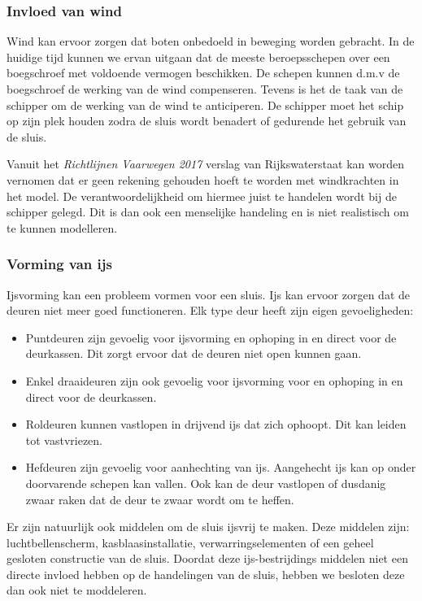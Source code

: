 \documentclass{article}
\begin{document}

\subsubsection{Invloed van wind} %
Wind kan ervoor zorgen dat boten onbedoeld in beweging worden gebracht. In de huidige tijd kunnen we ervan uitgaan dat de meeste beroepsschepen over een boegschroef  met voldoende vermogen beschikken. De schepen kunnen d.m.v de boegschroef de werking van de wind compenseren. Tevens is het de taak van de schipper om de werking van de wind te anticiperen. De schipper moet het schip op zijn plek houden zodra de sluis wordt benadert of gedurende het gebruik van de sluis.

Vanuit het \textit{Richtlijnen Vaarwegen 2017} verslag van Rijkswaterstaat \cite{rijkswaterstaat2017} kan worden vernomen dat er geen rekening gehouden hoeft te worden met windkrachten in het model. De verantwoordelijkheid om hiermee juist te handelen wordt bij de schipper gelegd. Dit is dan ook een menselijke handeling en is niet realistisch om te kunnen modelleren.

\vskip0.5cm

\subsubsection{Vorming van ijs}
Ijsvorming kan een probleem vormen voor een sluis. Ijs kan ervoor zorgen dat de deuren niet meer goed functioneren. Elk type deur heeft zijn eigen gevoeligheden:
\begin{itemize}
\item Puntdeuren zijn gevoelig voor ijsvorming en ophoping in en direct voor de deurkassen. Dit zorgt ervoor dat de deuren niet open kunnen gaan.
\item Enkel draaideuren zijn ook gevoelig voor ijsvorming voor en ophoping in en direct voor de deurkassen.
\item Roldeuren kunnen vastlopen in drijvend ijs dat zich ophoopt. Dit kan leiden tot vastvriezen.
\item Hefdeuren zijn gevoelig voor aanhechting van ijs. Aangehecht ijs kan op onder doorvarende schepen kan vallen. Ook kan de deur vastlopen of dusdanig zwaar raken dat de deur te zwaar wordt om te heffen.
\end{itemize}

Er zijn natuurlijk ook middelen om de sluis ijsvrij te maken. Deze middelen zijn: luchtbellenscherm, kasblaasinstallatie, verwarringselementen of een geheel gesloten constructie van de sluis.
Doordat deze ijs-bestrijdings middelen niet een directe invloed hebben op de handelingen van de sluis, hebben we besloten deze dan ook niet te moddeleren.
\end{document}
